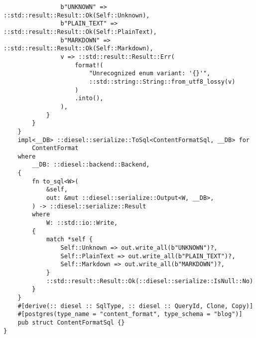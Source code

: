 \begin{verbatim}
                b"UNKNOWN" => ::std::result::Result::Ok(Self::Unknown),
                b"PLAIN_TEXT" => ::std::result::Result::Ok(Self::PlainText),
                b"MARKDOWN" => ::std::result::Result::Ok(Self::Markdown),
                v => ::std::result::Result::Err(
                    format!(
                        "Unrecognized enum variant: '{}'",
                        ::std::string::String::from_utf8_lossy(v)
                    )
                    .into(),
                ),
            }
        }
    }
    impl<__DB> ::diesel::serialize::ToSql<ContentFormatSql, __DB> for
        ContentFormat
    where
        __DB: ::diesel::backend::Backend,
    {
        fn to_sql<W>(
            &self,
            out: &mut ::diesel::serialize::Output<W, __DB>,
        ) -> ::diesel::serialize::Result
        where
            W: ::std::io::Write,
        {
            match *self {
                Self::Unknown => out.write_all(b"UNKNOWN")?,
                Self::PlainText => out.write_all(b"PLAIN_TEXT")?,
                Self::Markdown => out.write_all(b"MARKDOWN")?,
            }
            ::std::result::Result::Ok(::diesel::serialize::IsNull::No)
        }
    }
    #[derive(:: diesel :: SqlType, :: diesel :: QueryId, Clone, Copy)]
    #[postgres(type_name = "content_format", type_schema = "blog")]
    pub struct ContentFormatSql {}
}
\end{verbatim}
